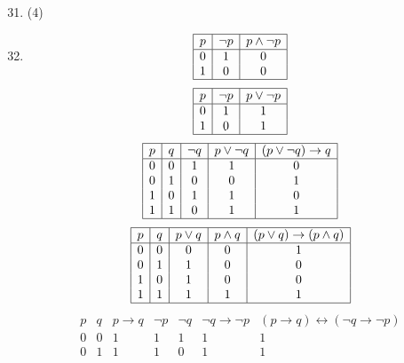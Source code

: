 \documentclass[12pt]{article}
\newcommand{\enumset}[1]{\setcounter{enumi}{#1}}
\begin{document}
\begin{enumerate}
				\enumset{30}
				\item
					\begin{tasks}(4)
					\end{tasks}
				\enumset{32}
				\item
					\begin{tasks}
						\task
							\[\begin{array}{|*{3}{c|}}\hline
								p & \lnot p & p \land \lnot p \\\hline
								0 & 1 & 0 \\
								1 & 0 & 0 \\\hline
							\end{array}\]
						\task
							\[\begin{array}{|*{3}{c|}}\hline
								p & \lnot p & p \lor \lnot p \\\hline
								0 & 1 & 1 \\
								1 & 0 & 1 \\\hline
							\end{array}\]
						\task
							\[\begin{array}{|*{5}{c|}}\hline
								p & q & \lnot q & p \lor \lnot q & (p \lor \lnot q) \to q \\\hline
								0 & 0 & 1 & 1 & 0 \\
								0 & 1 & 0 & 0 & 1 \\
								1 & 0 & 1 & 1 & 0 \\
								1 & 1 & 0 & 1 & 1 \\\hline
							\end{array}\]
						\task
							\[\begin{array}{|*{5}{c|}}\hline
								p & q & p \lor q & p \land q & (p \lor q) \to (p \land q) \\\hline
								0 & 0 & 0 & 0 & 1 \\
								0 & 1 & 1 & 0 & 0 \\
								1 & 0 & 1 & 0 & 0 \\
								1 & 1 & 1 & 1 & 1 \\\hline
							\end{array}\]
						\task
							\[\begin{array}{|*{7}{c|}}\hline
								p & q & p \to q & \lnot p & \lnot q & \lnot q \to \lnot p & (p \to q) \leftrightarrow (\lnot q \to \lnot p) \\\hline
								0 & 0 & 1 & 1 & 1 & 1 & 1 \\
								0 & 1 & 1 & 1 & 0 & 1 & 1 \\

\end{array}\]
\end{tasks}
\end{enumerate}
\end{document}
